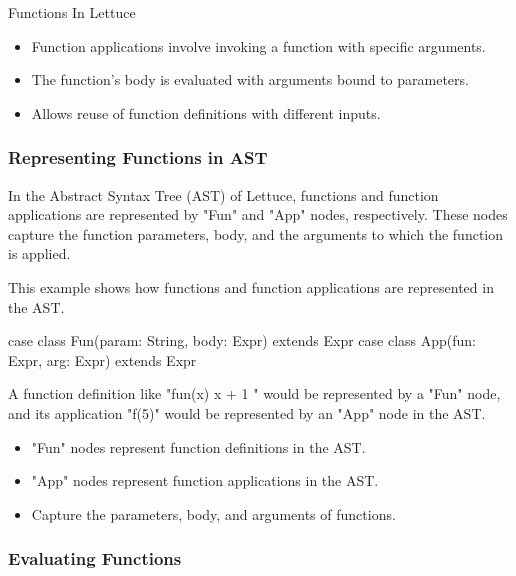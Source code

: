 \begin{notes}{Functions In Lettuce}
\begin{highlight}
        \begin{itemize}
            \item Function applications involve invoking a function with specific arguments.
            \item The function's body is evaluated with arguments bound to parameters.
            \item Allows reuse of function definitions with different inputs.
        \end{itemize}
    
    \end{highlight}
    
    \subsubsection*{Representing Functions in AST}
    
    In the Abstract Syntax Tree (AST) of Lettuce, functions and function applications are represented by "Fun" and "App" nodes, respectively. These nodes capture the function parameters, body, and the 
    arguments to which the function is applied.
    
    \begin{highlight}
    
        This example shows how functions and function applications are represented in the AST.
    
    \begin{code}[Scala]
    case class Fun(param: String, body: Expr) extends Expr
    case class App(fun: Expr, arg: Expr) extends Expr
    \end{code}
    
        A function definition like "fun(x) { x + 1 }" would be represented by a "Fun" node, and its application "f(5)" would be represented by an "App" node in the AST.
    
        \begin{itemize}
            \item "Fun" nodes represent function definitions in the AST.
            \item "App" nodes represent function applications in the AST.
            \item Capture the parameters, body, and arguments of functions.
        \end{itemize}
    
    \end{highlight}
    
    \subsubsection*{Evaluating Functions}
    

\end{notes}
